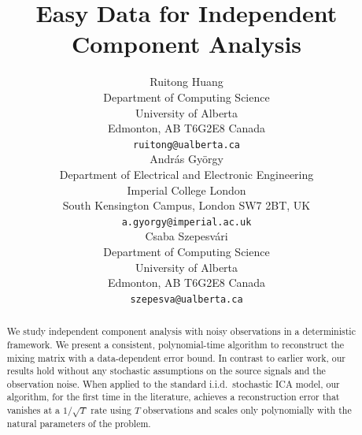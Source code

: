 \documentclass{article} %
\title{Easy Data for Independent Component Analysis}
\author{
Ruitong Huang \\
Department of Computing Science\\
University of Alberta \\
Edmonton, AB T6G2E8 Canada\\
\texttt{ruitong@ualberta.ca} \\
\And
Andr\'as Gy\"orgy \\
Department of Electrical and Electronic Engineering\\ 
Imperial College London\\ 
South Kensington Campus, London SW7 2BT, UK \\
\texttt{a.gyorgy@imperial.ac.uk} \\
\And
Csaba Szepesv\'ari \\
Department of Computing Science\\
University of Alberta \\
Edmonton, AB T6G2E8 Canada\\
\texttt{szepesva@ualberta.ca}
}
\theoremstyle{definition}
\begin{document}
\maketitle

\begin{abstract}
We study independent component analysis with noisy observations in a deterministic framework. We present a consistent, polynomial-time algorithm to reconstruct the mixing matrix with a data-dependent error bound. In contrast to earlier work, our results hold without any stochastic assumptions on the source signals and the observation noise. When applied
to the standard i.i.d.\ stochastic ICA model, 
our algorithm, for the first time in the literature, achieves a reconstruction error that vanishes at a $1/\sqrt{T}$ rate using $T$ observations and scales only polynomially with the natural parameters of the problem.  
\end{abstract}
\end{document}

